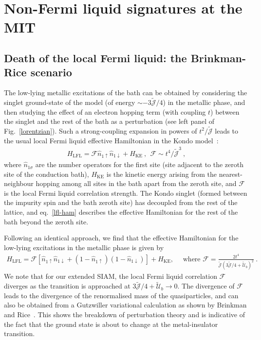 \documentclass{iopart}
\begin{document}
\section{Non-Fermi liquid signatures at the MIT}
\label{excitations}

\subsection{Death of the local Fermi liquid: the Brinkman-Rice scenario}

The low-lying metallic excitations of the bath can be obtained by considering the singlet ground-state of the model (of energy \(\sim -3\mathcal{\tilde J}/4\)) in the metallic phase, and then studying the effect of an electron hopping term (with coupling \(t\)) between the singlet and the rest of the bath as a perturbation (see left panel of Fig.~\eqref{lorentzian}). Such a strong-coupling expansion in powers of \(t^2/\mathcal{\tilde J}\) leads to the usual local Fermi liquid effective Hamiltonian in the Kondo model~\cite{nozieres1974fermi,wilson1975,Noz_blandin_1980,anirban_kondo}:
\begin{eqnarray}
	\label{lfl-ham}
	H_\text{LFL} = \mathcal{F} \hat n_{1 \uparrow} \hat n_{1 \downarrow} + H_\text{KE}~, ~ ~ \mathcal{F} \sim t^4 / \mathcal{\tilde J}^3~,
\end{eqnarray}
where \(\hat n_{1 \sigma}\) are the number operators for the first site (site adjacent to the zeroth site of the conduction bath), \(H_\text{KE}\) is the kinetic energy arising from the nearest-neighbour hopping among all sites in the bath apart from the zeroth site, and \(\mathcal{F}\) is the local Fermi liquid correlation strength. The Kondo singlet (formed between the impurity spin and the bath zeroth site) has decoupled from the rest of the lattice, and eq.~\eqref{lfl-ham} describes the effective Hamiltonian for the rest of the bath beyond the zeroth site. 

Following an identical approach, we find that the effective Hamiltonian for the low-lying excitations in the metallic phase is given by
\begin{eqnarray}
	H_\text{LFL} = \mathcal{F}\left[\hat n_{1 \uparrow} \hat n_{1 \downarrow} + \left(1 - \hat n_{1 \uparrow}\right) \left(1 - \hat n_{1 \downarrow}\right) \right] + H_\text{KE},\quad \text{ where }\mathcal{F} = \frac{2t^4}{\mathcal{\tilde J}\left(3\mathcal{\tilde J}/4 + \mathcal{\tilde U}_b\right)^2}~.
\end{eqnarray}
We note that for our extended SIAM, the local Fermi liquid correlation \(\mathcal{F}\) diverges as the transition is approached at \(3\mathcal{\tilde J}/4 + \mathcal{\tilde U}_b \to 0\). The divergence of \(\mathcal{F}\) leads to the divergence of the renormalised mass of the quasiparticles, and can also be obtained from a Gutzwiller variational calculation as shown by Brinkman and Rice~\cite{brinkman_rice_1970}. This shows the breakdown of perturbation theory and is indicative of the fact that the ground state is about to change at the metal-insulator transition.
\end{document}
